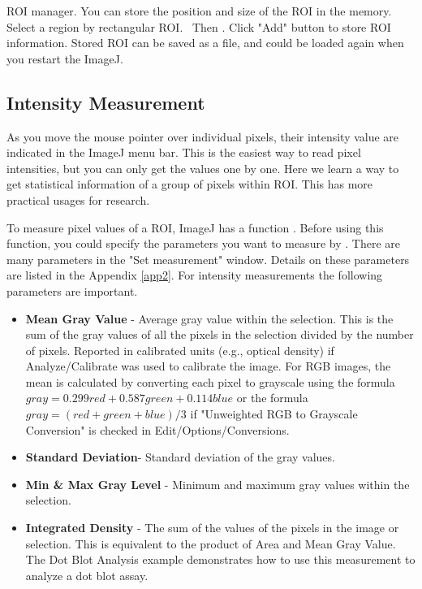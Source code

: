\begin{indentexercise}{5}
ROI manager. You can store the position and
size of the ROI in the memory. Select a region by rectangular ROI.
\ Then . Click "Add" button to store
ROI information. Stored ROI can be saved as a file, and could be loaded
again when you restart the ImageJ.
\end{indentexercise}


\subsection{Intensity Measurement}

As you move the mouse pointer over individual pixels, their intensity value are indicated in the ImageJ menu bar. This is the easiest way to
read pixel intensities, but you can only get the values one by one. Here we learn a way to get statistical information of a group
of pixels within ROI. This has more practical usages for research. 

To measure pixel values of a ROI, ImageJ has a function . Before using this function, you could specify the parameters 
you want to measure by . There are many parameters
in the "Set measurement" window. Details on these parameters are listed in the
Appendix \ref{app2}. For intensity measurements the following parameters are
important.


\begin{itemize}
\item \textbf{Mean Gray Value} - Average gray value within the selection. This
is the sum of the gray values of all the pixels in the selection
divided by the number of pixels. Reported in calibrated units (e.g.,
optical density) if Analyze/Calibrate was used to calibrate the image.
For RGB images, the mean is calculated by converting each pixel to
grayscale using the formula $gray=0.299red+0.587green+0.114blue$ or the
formula $gray=(red+green+blue)/3$ if "Unweighted RGB to
Grayscale Conversion" is checked in Edit/Options/Conversions.

\item\textbf{Standard Deviation}{}- Standard deviation of the gray values.

\item\textbf{Min \& Max Gray Level} - Minimum and maximum gray values within
the selection.

\item\textbf{Integrated Density} - The sum of the values of the pixels in the
image or selection. This is equivalent to the product of Area and Mean
Gray Value. The Dot Blot Analysis example demonstrates how to use this
measurement to analyze a dot blot assay.
\end{itemize}

